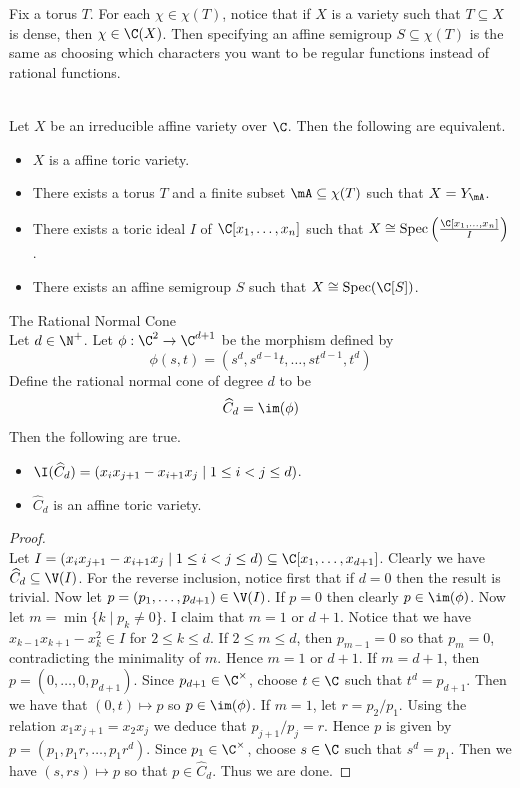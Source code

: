 \documentclass[a4paper]{article}
\begin{document}
Fix a torus $T$. For each $\chi\in\chi(T)$, notice that if $X$ is a variety such that $T\subseteq X$ is dense, then $\chi\in\C(X)$. Then specifying an affine semigroup $S\subseteq\chi(T)$ is the same as choosing which characters you want to be regular functions instead of rational functions. 

\begin{prp}{}{}\\
Let $X$ be an irreducible affine variety over $\C$. Then the following are equivalent. 
\begin{itemize}
\item $X$ is a affine toric variety. 
\item There exists a torus $T$ and a finite subset $\mA\subseteq\chi(T)$ such that $X=Y_{\mA}$. 
\item There exists a toric ideal $I$ of $\C[x_1,\dots,x_n]$ such that $X\cong\text{Spec}\left(\frac{\C[x_1,\dots,x_n]}{I}\right)$. 
\item There exists an affine semigroup $S$ such that $X\cong\text{Spec}(\C[S])$. 
\end{itemize}
\end{prp}

\begin{eg}{The Rational Normal Cone}{}\\
Let $d\in\N^+$. Let $\phi:\C^2\to\C^{d+1}$ be the morphism defined by $$\phi(s,t)=(s^d,s^{d-1}t,\dots,st^{d-1},t^d)$$ Define the rational normal cone of degree $d$ to be $$\widehat{C}_d=\im(\phi)$$ Then the following are true. 
\begin{itemize}
\item $\I(\widehat{C}_d)=(x_ix_{j+1}-x_{i+1}x_j\;|\;1\leq i<j\leq d)$. 
\item $\widehat{C}_d$ is an affine toric variety. 
\end{itemize}
\begin{proof}\\
Let $I=(x_ix_{j+1}-x_{i+1}x_j\;|\;1\leq i<j\leq d)\subseteq\C[x_1,\dots,x_{d+1}]$. Clearly we have $\widehat{C}_d\subseteq\V(I)$. For the reverse inclusion, notice first that if $d=0$ then the result is trivial. Now let $p=(p_1,\dots,p_{d+1})\in\V(I)$. If $p=0$ then clearly $p\in\im(\phi)$. Now let $m=\min\{k\;|\;p_k\neq 0\}$. I claim that $m=1$ or $d+1$. Notice that we have $x_{k-1}x_{k+1}-x_k^2\in I$ for $2\leq k\leq d$. If $2\leq m\leq d$, then $p_{m-1}=0$ so that $p_m=0$, contradicting the minimality of $m$. Hence $m=1$ or $d+1$. If $m=d+1$, then $p=(0,\dots,0,p_{d+1})$. Since $p_{d+1}\in\C^\times$, choose $t\in\C$ such that $t^d=p_{d+1}$. Then we have that $(0,t)\mapsto p$ so $p\in\im(\phi)$. If $m=1$, let $r=p_2/p_1$. Using the relation $x_1x_{j+1}=x_2x_j$ we deduce that $p_{j+1}/p_j=r$. Hence $p$ is given by $p=(p_1,p_1r,\dots,p_1r^d)$. Since $p_1\in\C^\times$, choose $s\in\C$ such that $s^d=p_1$. Then we have $(s,rs)\mapsto p$ so that $p\in\widehat{C}_d$. Thus we are done. 
\end{proof}
\end{eg}
\end{document}
